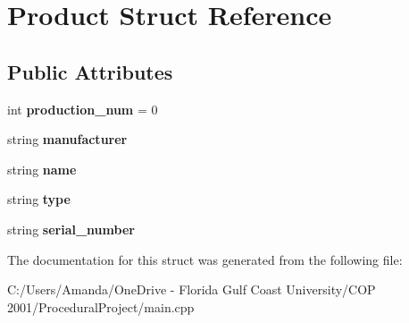 \hypertarget{struct_product}{}\section{Product Struct Reference}
\label{struct_product}
\subsection*{Public Attributes}
\begin{DoxyCompactItemize}
\item 
\mbox{\label{struct_product_af71488e7264950d6c5e436b06d665424}} 
int {\bfseries production\+\_\+num} = 0
\item 
\mbox{\label{struct_product_a8f61a5cbe040dab24e99cdb93b862cf7}} 
string {\bfseries manufacturer}
\item 
\mbox{\label{struct_product_acc9bddcf74112d85a6dc231db2269b8d}} 
string {\bfseries name}
\item 
\mbox{\label{struct_product_ace4dcea8c2c91295212287ee5c86036a}} 
string {\bfseries type}
\item 
\mbox{\label{struct_product_a8ea70b9e2ab6fef371b99256222ae429}} 
string {\bfseries serial\+\_\+number}
\end{DoxyCompactItemize}


The documentation for this struct was generated from the following file\+:\begin{DoxyCompactItemize}
\item 
C\+:/\+Users/\+Amanda/\+One\+Drive -\/ Florida Gulf Coast University/\+C\+O\+P 2001/\+Procedural\+Project/main.\+cpp\end{DoxyCompactItemize}
